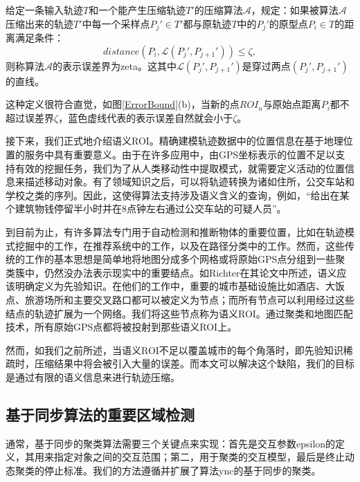 \begin{dingyi}[表示误差界]
给定一条输入轨迹$T$和一个能产生压缩轨迹$T'$的压缩算法$\mathcal{A}$，规定：如果被算法$\mathcal{A}$压缩出来的轨迹$T'$中每一个采样点$P_j' \in T'$都与原轨迹$T$中的$P_j'$的原型点$P_i \in T$的距离满足条件：
\begin{equation}
\label{eq:errorbound}
{distance}\left(P_i,\mathcal{L}(P_j',P_{j+1}')\right) \le \zeta,
\end{equation}
则称算法$\mathcal{A}$的表示误差界为\gls{zeta}。这其中$\mathcal{L}(P_j',P_{j+1}')$是穿过两点$(P_j',P_{j+1}')$的直线。
\end{dingyi}
这种定义很符合直觉，如图\ref{ErrorBound}(b)，当新的点$ROI_{u}$与原始点距离$P_i$都不超过误差界$\zeta$，蓝色虚线代表的表示误差自然就会小于$\zeta$。

接下来，我们正式地介绍语义ROI。精确建模轨迹数据中的位置信息在基于地理位置的服务中具有重要意义。由于在许多应用中，由GPS坐标表示的位置不足以支持有效的挖掘任务，我们为了从人类移动性中提取模式，就需要定义活动的位置信息来描述移动对象。有了领域知识之后，可以将轨迹转换为诸如住所，公交车站和学校之类的序列。因此，这使得算法支持涉及语义含义的查询，例如，“给出在某个建筑物钱停留半小时并在8点钟左右通过公交车站的可疑人员”。

到目前为止，有许多算法专门用于自动检测和推断物体的重要位置，比如在轨迹模式挖掘中的工作，在推荐系统中的工作，以及在路径分类中的工作。然而，这些传统的工作的基本思想是简单地将地图分成多个网格或将原始GPS点分组到一些聚类簇中，仍然没办法表示现实中的重要结点。如Richter在其论文中所述，语义应该明确定义为先验知识。在他们的工作中，重要的城市基础设施比如酒店、大饭点、旅游场所和主要交叉路口都可以被定义为节点；而所有节点可以利用经过这些结点的轨迹扩展为一个网络。我们将这些节点称为语义ROI。通过聚类和地图匹配技术，所有原始GPS点都将被投射到那些语义ROI上。

然而，如我们之前所述，当语义ROI不足以覆盖城市的每个角落时，即先验知识稀疏时，压缩结果中将会被引入大量的误差。而本文可以解决这个缺陷，我们的目标是通过有限的语义信息来进行轨迹压缩。



\subsection{基于同步算法的重要区域检测}
通常，基于同步的聚类算法需要三个关键点来实现：首先是交互参数\gls{epsilon}的定义，其用来指定对象之间的交互范围；第二，用于聚类的交互模型，最后是终止动态聚类的停止标准。我们的方法遵循并扩展了算法ync的基于同步的聚类。

